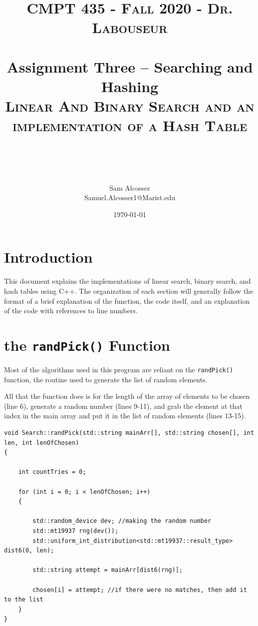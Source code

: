 \documentclass[letterpaper, 10pt]{article}
\title{	
   \normalfont \normalsize 
   \textsc{CMPT 435 - Fall 2020 - Dr. Labouseur} \\[10pt] %
   \horrule{0.5pt} \\[0.25cm] 	%
   \large{Assignment Three -- Searching and Hashing} \\
   \textsc{Linear And Binary Search and an implementation of a Hash Table}\\[20pt]%
 \author{Sam Alcosser \\ \normalsize Samuel.Alcosser1@Marist.edu}
   \horrule{0.5pt} \\ 	%
   


  
\date{\normalsize\today} 
}
\begin{document}
\selectfont
\maketitle
\tableofcontents
\newpage

\section{Introduction}

This document explains the implementations of linear search, binary search, and hash tables using C++. The organization of each section will generally follow the format of a brief explanation of the function, the code itself, and an explanation of the code with references to line numbers.


\section{the \texttt{randPick()} Function}

Most of the algorithms used in this program are reliant on the \texttt{randPick()} function, the routine used to generate the list of random elements. 

All that the function does is for the length of the array of elements to be chosen (line 6), generate a random number (lines 9-11), and grab the element at that index in the main array and put it in the list of random elements (lines 13-15).


\begin{addmargin}[-5em]{1em}
\begin{small}
\begin{verbatim}
void Search::randPick(std::string mainArr[], std::string chosen[], int len, int lenOfChosen)
{

	int countTries = 0;

	for (int i = 0; i < lenOfChosen; i++)
	{

		std::random_device dev; //making the random number
		std::mt19937 rng(dev());
		std::uniform_int_distribution<std::mt19937::result_type> dist6(0, len);

		std::string attempt = mainArr[dist6(rng)];

		chosen[i] = attempt; //if there were no matches, then add it to the list
	}
}

\end{verbatim}
\end{small}
\end{addmargin}
\end{document}
